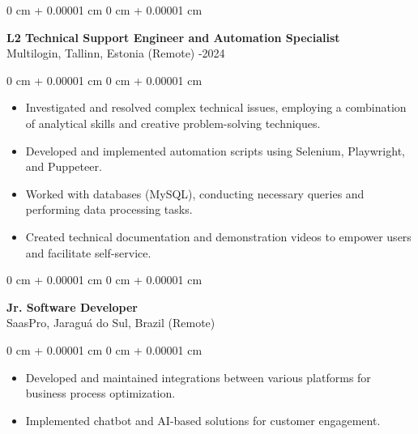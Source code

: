 \documentclass[10pt, letterpaper]{article}
\newenvironment{highlights}{
    \begin{itemize}[
        topsep=0.10 cm,
        parsep=0.10 cm,
        partopsep=0pt,
        itemsep=0pt,
        leftmargin=0 cm + 10pt
    ]
}{
    \end{itemize}
}
\newenvironment{onecolentry}{
    \begin{adjustwidth}{
        0 cm + 0.00001 cm
    }{
        0 cm + 0.00001 cm
    }
}{
    \end{adjustwidth}
}
\begin{document}
\vspace{0.2cm}

\begin{onecolentry}
    \setcolumnwidth{\fill, 4.5cm}
    \begin{paracol}{2}
        \textbf{L2 Technical Support Engineer and Automation Specialist} \\ Multilogin, Tallinn, Estonia (Remote)
        \switchcolumn
        -2024
    \end{paracol}
\end{onecolentry}
\vspace{0.10cm}
\begin{onecolentry}
    \begin{highlights}
                \item Investigated and resolved complex technical issues, employing a combination of analytical skills and creative problem-solving techniques.
                \item Developed and implemented automation scripts using Selenium, Playwright, and Puppeteer.
                \item Worked with databases (MySQL), conducting necessary queries and performing data processing tasks.
                \item Created technical documentation and demonstration videos to empower users and facilitate self-service.
    \end{highlights}
\end{onecolentry}

\vspace{0.2cm}

\begin{onecolentry}
    \setcolumnwidth{\fill, 4.5cm}
    \begin{paracol}{2}
        \textbf{Jr. Software Developer} \\ SaasPro, Jaraguá do Sul, Brazil (Remote)
        \switchcolumn
    \end{paracol}
\end{onecolentry}
\vspace{0.10cm}
\begin{onecolentry}
    \begin{highlights}
                \item Developed and maintained integrations between various platforms for business process optimization.
                \item Implemented chatbot and AI-based solutions for customer engagement.
    \end{highlights}
\end{onecolentry}
\end{document}
